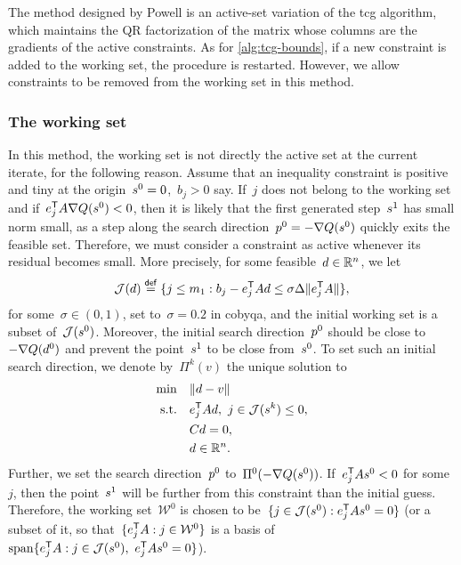 The method designed by Powell is an active-set variation of the \gls{tcg} algorithm, which maintains the QR factorization of the matrix whose columns are the gradients of the active constraints.
As for \cref{alg:tcg-bounds}, if a new constraint is added to the working set, the procedure is restarted.
However, we allow constraints to be removed from the working set in this method.

\subsubsection{The working set}

In this method, the working set is not directly the active set at the current iterate, for the following reason.
Assume that an inequality constraint is positive and tiny at the origin~$\sstep[0] = 0$,~$b_j > 0$ say.
If~$j$ does not belong to the working set and if~$e_j^{\T} A \nabla Q(\sstep[0]) < 0$, then it is likely that the first generated step~$\sstep[1]$ has small norm small, as a step along the search direction~$\pstep[0] = -\nabla Q(\sstep[0])$ quickly exits the feasible set.
Therefore, we must consider a constraint as active whenever its residual becomes small.
More precisely, for some feasible~$\step \in \R^n$, we let
\begin{equation*}
    \mathcal{J}(\step) \eqdef \set{j \le m_1 : b_j - e_j^{\T} A \step \le \sigma \rad \norm{e_j^{\T} A}},
\end{equation*}
for some~$\sigma \in (0, 1)$, set to~$\sigma = 0.2$ in \gls{cobyqa}, and the initial working set is a subset of~$\mathcal{J}(\sstep[0])$.
Moreover, the initial search direction~$\pstep[0]$ should be close to~$-\nabla Q(\step[0])$ and prevent the point~$\sstep[1]$ to be close from~$\sstep[0]$.
To set such an initial search direction, we denote by~$\Pi^k(v)$ the unique solution to
\begin{subequations}
    \label{eq:tcg-linear-working-set}
    \begin{align}
        \min        & \quad \norm{\step - v}\\
        \text{s.t.} & \quad e_j^{\T} A \step, ~ j \in \mathcal{J}(\sstep[k]) \le 0,\\
                    & \quad C \step = 0,\\
                    & \quad \step \in \R^n. \nonumber
    \end{align}
\end{subequations}
Further, we set the search direction~$\pstep[0]$ to~$\Pi^0(-\nabla Q(\sstep[0]))$.
If~$e_j^{\T} A \sstep[0] < 0$ for some~$j$, then the point~$\sstep[1]$ will be further from this constraint than the initial guess.
Therefore, the working set~$\mathcal{W}^0$ is chosen to be~$\set{j \in \mathcal{J}(\sstep[0]) : e_j^{\T} A \sstep[0] = 0}$ (or a subset of it, so that~$\{e_j^{\mathsf{T}} A : j \in \mathcal{W}^0\}$ is a basis of~$\vspan \set{e_j^{\T} A : j \in \mathcal{J}(\sstep[0]), ~ e_j^{\T} A \sstep[0] = 0}$).

